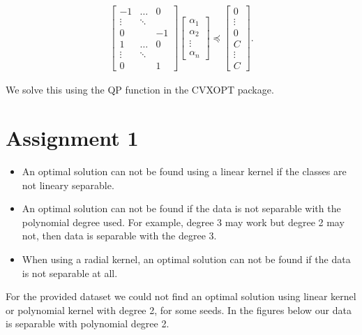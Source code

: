 \documentclass{article}
\begin{document}
\begin{align*}
\begin{bmatrix}
-1 & \hdots & 0 \\
\vdots & \ddots & \\
0  &  & -1 \\
1 & \hdots & 0 \\
\vdots & \ddots & \\
0  &  & 1
\end{bmatrix}
 \begin{bmatrix}
\alpha_1 \\
\alpha_2 \\
\vdots \\
\alpha_n 
\end{bmatrix}
\preccurlyeq
 \begin{bmatrix}
0 \\
\vdots \\
0 \\
C \\
\vdots \\
C
\end{bmatrix}.
\end{align*}


We solve this using the QP function in the CVXOPT package. 

\section*{Assignment 1}

\begin{itemize}
 \item An optimal solution can not be found using a linear kernel if the classes are not lineary separable.
 \item An optimal solution can not be found if the data is not separable with the polynomial degree used. 
 For example, degree 3 may work but degree 2 may not, then data is separable with the degree 3. 
 \item When using a radial kernel, an optimal solution can not be found if the data is not separable at all. 
\end{itemize}



For the provided dataset we could not find an optimal solution using linear kernel or polynomial 
kernel with degree 2, for some seeds. In the figures below our data is separable with polynomial degree 2. 
\end{document}
